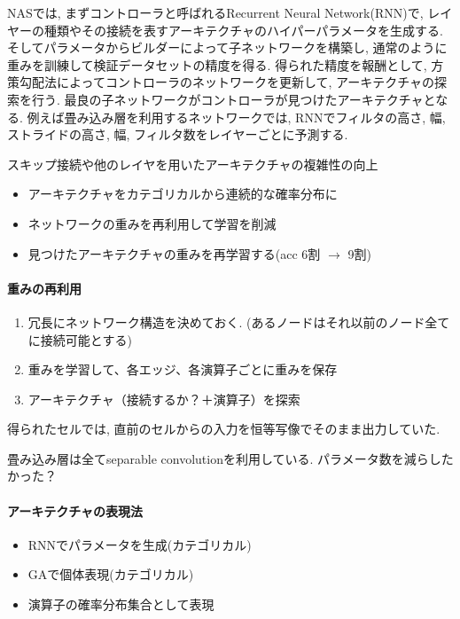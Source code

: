 \documentclass[twocolumn]{jarticle}     %
\begin{document}
NASでは, まずコントローラと呼ばれるRecurrent Neural Network(RNN)で, レイヤーの種類やその接続を表すアーキテクチャのハイパーパラメータを生成する. そしてパラメータからビルダーによって子ネットワークを構築し, 通常のように重みを訓練して検証データセットの精度を得る. 得られた精度を報酬として, 方策勾配法によってコントローラのネットワークを更新して, アーキテクチャの探索を行う. 最良の子ネットワークがコントローラが見つけたアーキテクチャとなる.
例えば畳み込み層を利用するネットワークでは, RNNでフィルタの高さ, 幅, ストライドの高さ, 幅, フィルタ数をレイヤーごとに予測する.

スキップ接続や他のレイヤを用いたアーキテクチャの複雑性の向上


\begin{itemize}
  \item アーキテクチャをカテゴリカルから連続的な確率分布に
  \item ネットワークの重みを再利用して学習を削減
  \item 見つけたアーキテクチャの重みを再学習する(acc 6割 $\rightarrow$ 9割)
\end{itemize}

\paragraph{重みの再利用}
\begin{enumerate}
  \item 冗長にネットワーク構造を決めておく. (あるノードはそれ以前のノード全てに接続可能とする)
  \item 重みを学習して、各エッジ、各演算子ごとに重みを保存
  \item アーキテクチャ（接続するか？＋演算子）を探索
\end{enumerate}

得られたセルでは,
直前のセルからの入力を恒等写像でそのまま出力していた.

畳み込み層は全てseparable convolutionを利用している. パラメータ数を減らしたかった？

\paragraph{アーキテクチャの表現法}
\begin{itemize}
  \item RNNでパラメータを生成(カテゴリカル)
  \item GAで個体表現(カテゴリカル)
  \item 演算子の確率分布集合として表現
\end{itemize}
\end{document}
